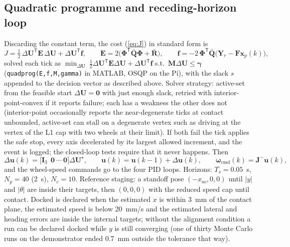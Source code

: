 \documentclass[11pt,a4paper]{article}
\newcommand{\vect}[1]{\bm{#1}}
\newcommand{\mat}[1]{\bm{#1}}
\newcommand{\T}{^{\mathsf{T}}}
\newcommand{\dU}{\Delta\vect{U}}
\newcommand{\du}{\Delta\vect{u}}
\newcommand{\Ts}{T_s}
\newcommand{\Np}{N_p}
\newcommand{\Nc}{N_c}
\newcommand{\Qbar}{\bar{\mat{Q}}}
\newcommand{\Rbar}{\bar{\mat{R}}}
\begin{document}
\subsection{Quadratic programme and receding-horizon loop}
Discarding the constant term, the cost (\ref{eq:J}) in standard form is
\begin{equation}
J = \tfrac12\,\dU\T\mat E\,\dU + \dU\T\vect f,
\qquad
\mat E = 2\big(\mat\Phi\T\Qbar\mat\Phi+\Rbar\big),
\qquad
\vect f = -2\,\mat\Phi\T\Qbar\big(\vect Y_r-\mat F\vect x_p(k)\big),
\label{eq:qp}
\end{equation}
solved each tick as $\min_{\dU}\ \tfrac12\dU\T\mat E\dU+\dU\T\vect f$ s.t.\ $\mat M\dU\le\vect\gamma$ (\texttt{quadprog(E,f,M,gamma)} in MATLAB, OSQP on the Pi), with the slack $s$ appended to the decision vector as described above. Solver strategy: active-set from the feasible start $\dU=\vect 0$ with just enough slack, retried with interior-point-convex if it reports failure; each has a weakness the other does not (interior-point occasionally reports the near-degenerate ticks at contact unbounded, active-set can stall on a degenerate vertex such as driving at the vertex of the L1 cap with two wheels at their limit). If both fail the tick applies the safe stop, every axis decelerated by its largest allowed increment, and the event is logged; the closed-loop tests require that it never happens. Then
\begin{equation}
\du(k) = \big[\mat I_3\ \ \mat 0\ \cdots\ \mat 0\big]\dU^\star,
\qquad
\vect u(k) = \vect u(k-1)+\du(k),
\qquad
\vect\omega_{\mathrm{cmd}}(k) = \mat J^{-}\vect u(k),
\end{equation}
and the wheel-speed commands go to the four PID loops. Horizons: $\Ts=0.05$~s, $\Np=40$ (2~s), $\Nc=10$. Reference staging: a standoff pose $(-x_{\mathrm{so}},0,0)$ until $|y|$ and $|\theta|$ are inside their targets, then $(0,0,0)$ with the reduced speed cap until contact. Docked is declared when the estimated $x$ is within 3~mm of the contact plane, the estimated speed is below 20~mm/s and the estimated lateral and heading errors are inside the internal targets; without the alignment condition a run can be declared docked while $y$ is still converging (one of thirty Monte Carlo runs on the demonstrator ended 0.7~mm outside the tolerance that way).
\end{document}
